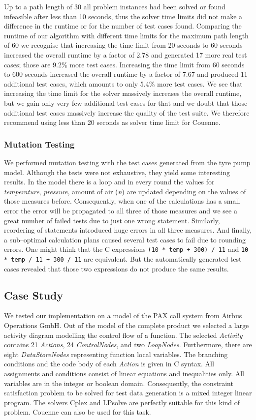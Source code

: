 \documentclass[runningheads,a4paper]{llncs}%
\newcommand{\UMLType}[1]{\textsf{\textit{#1}}} %
\newcommand{\OCLVar}[1]{\textit{#1}}
\begin{document}
Up to a path length of 30 all problem instances had been solved or found
infeasible after less than 10 seconds, thus the solver time limits did not make
a difference in the runtime or for the number of test cases found. Comparing the
runtime of our algorithm with different time limits for the maximum path length
of 60 we recognise that increasing the time limit from 20 seconds to 60 seconds
increased the overall runtime by a factor of 2.78 and generated 17 more real
test cases; those are 9.2\% more test cases. Increasing the time limit from 60
seconds to 600 seconds increased the overall runtime by a factor of 7.67 and
produced 11 additional test cases, which amounts to only 5.4\% more test cases.
We see that increasing the time limit for the solver massively increases the
overall runtime, but we gain only very few additional test cases for that and we
doubt that those additional test cases massively increase the quality of the
test suite. We therefore recommend using less than 20 seconds as solver time
limit for Couenne.
\subsubsection{Mutation Testing}
We performed mutation testing with the test cases generated from the tyre pump
model. Although the tests were not exhaustive, they yield some interesting
results. In the model there is a loop and in every round the values for
\OCLVar{temperature}, \OCLVar{pressure}, amount of air (\OCLVar{n}) are updated
depending on the values of those measures before. Consequently, when one of the
calculations has a small error the error will be propagated to all three of
those measures and we see a great number of failed tests due to just one wrong
statement. Similarly, reordering of statements introduced huge errors in all
three measures. And finally, a sub--optimal calculation plans caused several
test cases to fail due to rounding errors. One might think that the C
expressions \verb$(10 * temp + 300) / 11$ and \verb$10 * temp / 11 + 300 / 11$
are equivalent. But the automatically generated test cases revealed that those
two expressions do not produce the same results.
\subsection{Case Study}
\label{sec:CaseStudy}
We tested our implementation on a model of the PAX call system from Airbus
Operations GmbH. Out of the model of the complete product we selected a large
activity diagram modelling the control flow of a function. The selected
\UMLType{Activity} contains 21 \UMLType{Actions}, 24 \UMLType{ControlNodes}, and
two \UMLType{LoopNodes}. Furthermore, there are eight \UMLType{DataStoreNodes}
representing function local variables. The branching conditions and the code
body of each \UMLType{Action} is given in C syntax. All assignments and
conditions consist of linear equations and inequalities only. All variables are
in the integer or boolean domain. Consequently, the constraint satisfaction
problem to be solved for test data generation is a mixed integer linear program.
The solvers Cplex and LPsolve are perfectly suitable for this kind of problem.
Couenne can also be used for this task.
\end{document}
